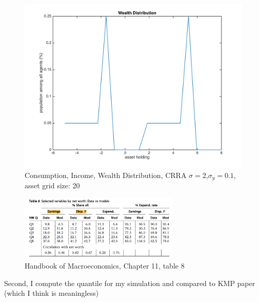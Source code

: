 \documentclass{article}[a4paper]
\begin{document}
\begin{figure}[htbp]
\begin{minipage}[t]{0.48\textwidth}
\centering
\includegraphics[width=\textwidth]{img/wealthdist.png}
\end{minipage}
\caption{Consumption, Income, Wealth Distribution, CRRA $\sigma=2$,$\sigma_y=0.1$, asset grid size: 20}
\end{figure}

\begin{figure}[htbp]
\centering
\includegraphics[width=0.68\textwidth]{img/table8.png}
\caption{Handbook of Macroeconomics, Chapter 11, table 8}\label{fig41qa}
\end{figure}

Second, I compute the quantile for my simulation and compared to KMP paper (which I think is meaningless)
\end{document}
